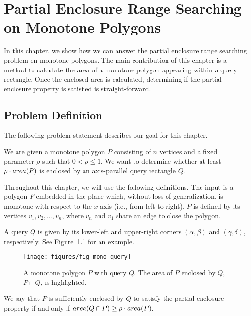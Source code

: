 \chapter{Partial Enclosure Range Searching on Monotone Polygons}
\label{:monotonep}


In this chapter, we show how we can answer the partial enclosure range searching problem on monotone polygons. 
The main contribution of this chapter is a method to calculate the area of a monotone polygon appearing within a query rectangle. 
Once the enclosed area is calculated, determining if the partial enclosure property is satisfied is straight-forward.


\section{Problem Definition}
\label{:monotonep:problem-definition}

The following problem statement describes our goal for this chapter.

\begin{problem}
We are given a monotone polygon $P$ consisting of $n$ vertices and a fixed parameter $\rho$ such that $0 < \rho \leq 1$. We want to determine whether at least $\rho \cdot area(P)$ is enclosed by an axis-parallel query rectangle $Q$.
\end{problem}

Throughout this chapter, we will use the following definitions.
The input is a polygon $P$ embedded in the plane which, without loss of generalization, is monotone with respect to the $x$-axis (i.e., from left to right). 
$P$ is defined by its vertices $v_1, v_2, \ldots, v_n$, where $v_n$ and $v_1$ share an edge to close the polygon.

A query $Q$ is given by its lower-left and upper-right corners $(\alpha, \beta)$ and $(\gamma, \delta)$, respectively. See Figure~\ref{fig:monotonep:query-example} for an example.

\begin{figure}[t]
\begin{center}
  \texttt{[image: figures/fig\_mono\_query]}
  \caption[A monotone polygon $P$ with query $Q$.]{A monotone polygon $P$ with query $Q$. The area of $P$ enclosed by $Q$, $P \cap Q$, is highlighted.}
  \label{fig:monotonep:query-example}
\end{center}
\end{figure}

We say that $P$ is sufficiently enclosed by $Q$ to satisfy the partial enclosure property if and only if $area(Q \cap P) \geq \rho \cdot area(P)$.


